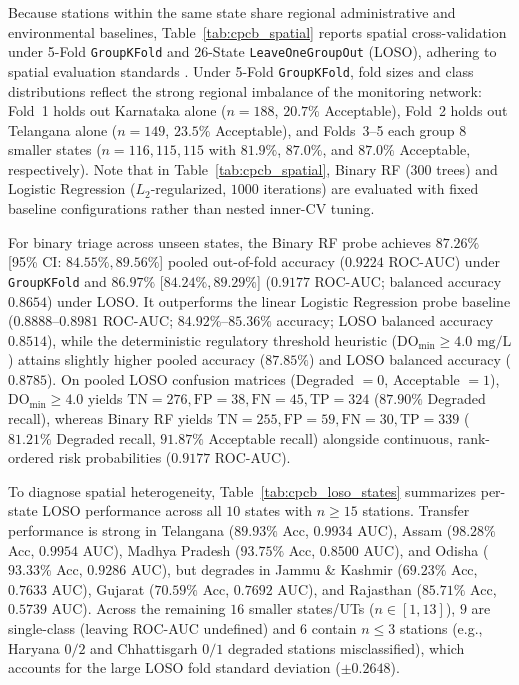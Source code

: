 \documentclass[pdflatex,sn-mathphys-num]{sn-jnl}%
\theoremstyle{thmstyleone}%
\theoremstyle{thmstyletwo}%
\theoremstyle{thmstylethree}%
\begin{document}
Because stations within the same state share regional administrative and environmental baselines, Table~\ref{tab:cpcb_spatial} reports spatial cross-validation under 5-Fold \texttt{GroupKFold} and 26-State \texttt{LeaveOneGroupOut} (LOSO), adhering to spatial evaluation standards \cite{roberts2017,ploton2020}. Under 5-Fold \texttt{GroupKFold}, fold sizes and class distributions reflect the strong regional imbalance of the monitoring network: Fold~1 holds out Karnataka alone ($n = 188$, $20.7\%$ Acceptable), Fold~2 holds out Telangana alone ($n = 149$, $23.5\%$ Acceptable), and Folds~3--5 each group $8$ smaller states ($n = 116, 115, 115$ with $81.9\%$, $87.0\%$, and $87.0\%$ Acceptable, respectively). Note that in Table~\ref{tab:cpcb_spatial}, Binary RF ($300$ trees) and Logistic Regression ($L_2$-regularized, $1000$ iterations) are evaluated with fixed baseline configurations rather than nested inner-CV tuning.

For binary triage across unseen states, the Binary RF probe achieves $\mathbf{87.26\%}$ [95\% CI: $84.55\%, 89.56\%$] pooled out-of-fold accuracy ($0.9224$ ROC-AUC) under \texttt{GroupKFold} and $\mathbf{86.97\%}$ [$84.24\%, 89.29\%$] ($0.9177$ ROC-AUC; balanced accuracy $0.8654$) under LOSO. It outperforms the linear Logistic Regression probe baseline ($0.8888$--$0.8981$ ROC-AUC; $84.92\%$--$85.36\%$ accuracy; LOSO balanced accuracy $0.8514$), while the deterministic regulatory threshold heuristic ($\text{DO}_{\min} \ge 4.0\text{ mg/L}$) attains slightly higher pooled accuracy ($87.85\%$) and LOSO balanced accuracy ($0.8785$). On pooled LOSO confusion matrices (Degraded $= 0$, Acceptable $= 1$), $\text{DO}_{\min} \ge 4.0$ yields $\text{TN} = 276, \text{FP} = 38, \text{FN} = 45, \text{TP} = 324$ ($87.90\%$ Degraded recall), whereas Binary RF yields $\text{TN} = 255, \text{FP} = 59, \text{FN} = 30, \text{TP} = 339$ ($81.21\%$ Degraded recall, $91.87\%$ Acceptable recall) alongside continuous, rank-ordered risk probabilities ($0.9177$ ROC-AUC).

To diagnose spatial heterogeneity, Table~\ref{tab:cpcb_loso_states} summarizes per-state LOSO performance across all $10$ states with $n \ge 15$ stations. Transfer performance is strong in Telangana ($89.93\%$ Acc, $0.9934$ AUC), Assam ($98.28\%$ Acc, $0.9954$ AUC), Madhya Pradesh ($93.75\%$ Acc, $0.8500$ AUC), and Odisha ($93.33\%$ Acc, $0.9286$ AUC), but degrades in Jammu \& Kashmir ($69.23\%$ Acc, $0.7633$ AUC), Gujarat ($70.59\%$ Acc, $0.7692$ AUC), and Rajasthan ($85.71\%$ Acc, $0.5739$ AUC). Across the remaining $16$ smaller states/UTs ($n \in [1, 13]$), $9$ are single-class (leaving ROC-AUC undefined) and $6$ contain $n \le 3$ stations (e.g., Haryana $0/2$ and Chhattisgarh $0/1$ degraded stations misclassified), which accounts for the large LOSO fold standard deviation ($\pm 0.2648$).
\end{document}
